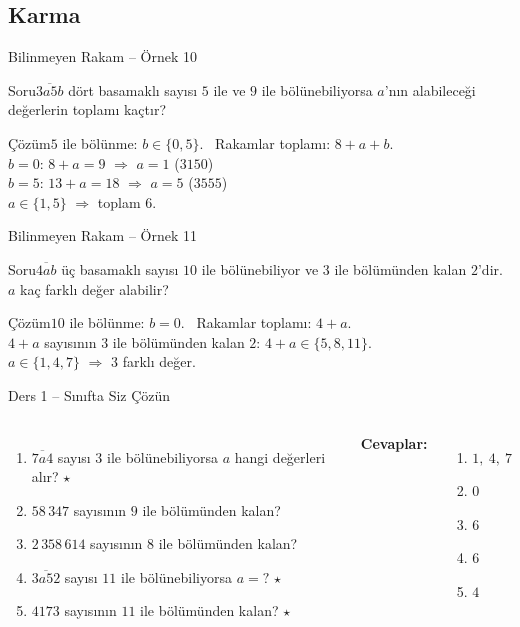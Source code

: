 \documentclass[aspectratio=169,11pt]{beamer}
\newcommand{\soru}[3]{%
\begin{frame}{#1}
  \begin{block}{Soru}\large #2\end{block}
  \pause
  \begin{exampleblock}{Çözüm}\large #3\end{exampleblock}
\end{frame}}
\newcommand{\ab}[1]{\overline{#1}}
\begin{document}
\subsection{Karma}
\soru{Bilinmeyen Rakam -- Örnek 10}
{\(\ab{3a5b}\) dört basamaklı sayısı \(5\) ile ve \(9\) ile bölünebiliyorsa \(a\)'nın alabileceği değerlerin toplamı kaçtır?}
{\(5\) ile bölünme: \(b\in\{0,5\}\). \ Rakamlar toplamı: \(8+a+b\).\\[3pt]
\(b=0\): \(8+a=9\) \(\Rightarrow\) \(a=1\) \quad (\(3150\))\\[3pt]
\(b=5\): \(13+a=18\) \(\Rightarrow\) \(a=5\) \quad (\(3555\))\\[3pt]
\(a\in\{1,5\}\) \(\Rightarrow\) toplam \(6\).}

\soru{Bilinmeyen Rakam -- Örnek 11}
{\(\ab{4ab}\) üç basamaklı sayısı \(10\) ile bölünebiliyor ve \(3\) ile bölümünden kalan \(2\)'dir. \(a\) kaç farklı değer alabilir?}
{\(10\) ile bölünme: \(b=0\). \ Rakamlar toplamı: \(4+a\).\\[3pt]
\(4+a\) sayısının \(3\) ile bölümünden kalan \(2\): \(4+a\in\{5,8,11\}\).\\[3pt]
\(a\in\{1,4,7\}\) \(\Rightarrow\) \(3\) farklı değer.}

\begin{frame}{Ders 1 -- Sınıfta Siz Çözün}
\begin{columns}[t]
\begin{enumerate}
\item \(\ab{7a4}\) sayısı \(3\) ile bölünebiliyorsa \(a\) hangi değerleri alır? \(\star\)
\item \(58\,347\) sayısının \(9\) ile bölümünden kalan?
\item \(2\,358\,614\) sayısının \(8\) ile bölümünden kalan?
\item \(\ab{3a52}\) sayısı \(11\) ile bölünebiliyorsa \(a=?\) \(\star\)
\item \(4173\) sayısının \(11\) ile bölümünden kalan? \(\star\)
\end{enumerate}
\pause
\textbf{Cevaplar:}
\begin{enumerate}
\item \(1,\ 4,\ 7\)
\item \(0\)
\item \(6\)
\item \(6\)
\item \(4\)
\end{enumerate}
\end{columns}
\vspace{4pt}{\footnotesize \(\star\) işaretli soruların adım adım çözümü sonraki slaytlardadır.}
\end{frame}
\end{document}
